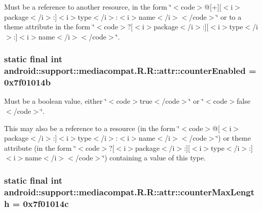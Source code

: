 Must be a reference to another resource, in the form \char`\"{}$<$code$>$@\mbox{[}+\mbox{]}\mbox{[}$<$i$>$package$<$/i$>$:\mbox{]}$<$i$>$type$<$/i$>$:$<$i$>$name$<$/i$>$$<$/code$>$\char`\"{} or to a theme attribute in the form \char`\"{}$<$code$>$?\mbox{[}$<$i$>$package$<$/i$>$:\mbox{]}\mbox{[}$<$i$>$type$<$/i$>$:\mbox{]}$<$i$>$name$<$/i$>$$<$/code$>$\char`\"{}. \hypertarget{classandroid_1_1support_1_1mediacompat_1_1_r_1_1attr_c446e6cebed1564c5f09813910f03aa4}{
\subsubsection[{counterEnabled}]{\setlength{\rightskip}{0pt plus 5cm}static final int android::support::mediacompat.R.R::attr::counterEnabled = 0x7f01014b}}
\label{classandroid_1_1support_1_1mediacompat_1_1_r_1_1attr_c446e6cebed1564c5f09813910f03aa4}


Must be a boolean value, either \char`\"{}$<$code$>$true$<$/code$>$\char`\"{} or \char`\"{}$<$code$>$false$<$/code$>$\char`\"{}. 

This may also be a reference to a resource (in the form \char`\"{}$<$code$>$@\mbox{[}$<$i$>$package$<$/i$>$:\mbox{]}$<$i$>$type$<$/i$>$:$<$i$>$name$<$/i$>$$<$/code$>$\char`\"{}) or theme attribute (in the form \char`\"{}$<$code$>$?\mbox{[}$<$i$>$package$<$/i$>$:\mbox{]}\mbox{[}$<$i$>$type$<$/i$>$:\mbox{]}$<$i$>$name$<$/i$>$$<$/code$>$\char`\"{}) containing a value of this type. \hypertarget{classandroid_1_1support_1_1mediacompat_1_1_r_1_1attr_84286f5743df750f3e0cb1e9f5cb57bf}{
\subsubsection[{counterMaxLength}]{\setlength{\rightskip}{0pt plus 5cm}static final int android::support::mediacompat.R.R::attr::counterMaxLength = 0x7f01014c}}
\label{classandroid_1_1support_1_1mediacompat_1_1_r_1_1attr_84286f5743df750f3e0cb1e9f5cb57bf}


